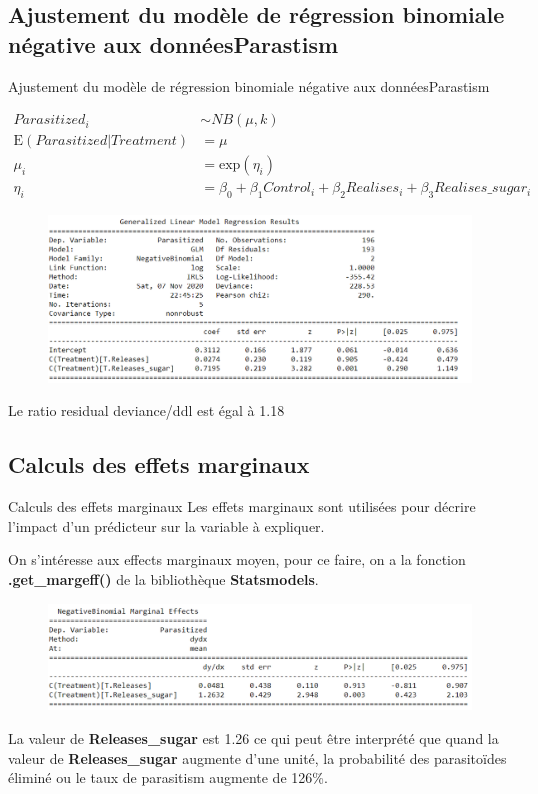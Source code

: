 \documentclass[aspectratio=1610]{beamer}
\begin{document}
\subsection{Ajustement du modèle de régression binomiale négative aux donnéesParastism}
\begin{frame}{Ajustement du modèle de régression binomiale négative aux donnéesParastism}

\begin{align*}
Parasitized_i &\sim NB(\mu, k)\\
\mathrm{E}({Parasitized|Treatment}) &= \mu\\
\mu_i &= \mathrm{exp}(\eta_i)\\
\eta_i &= \beta_0 + \beta_1 Control_i + \beta_2 Realises_i + \beta_3 Realises\_sugar_i
\end{align*}

\begin{figure}[h]
\centering
 \includegraphics[width=.7\textwidth]{NB.fit.png}

 \end{figure}
Le ratio residual deviance/ddl est égal à 1.18

\end{frame}

\subsection{Calculs des effets marginaux}
\begin{frame}{Calculs des effets marginaux}
Les effets marginaux sont utilisées pour décrire l’impact d’un prédicteur sur la variable à expliquer. 

On s'intéresse aux effects marginaux moyen, pour ce faire, on a la fonction \textbf{.get\_margeff()} de la bibliothèque \textbf{Statsmodels}.

 \begin{figure}[h]
\centering
 \includegraphics[width=1\textwidth]{marginal effects.png}

 \end{figure}  
 
 La valeur de \textbf{Releases\_sugar} est 1.26 ce qui peut être interprété que quand la valeur de \textbf{Releases\_sugar} augmente d'une unité, la probabilité des parasitoïdes éliminé ou le taux de parasitism augmente de 126\%.
\end{frame}
\end{document}
